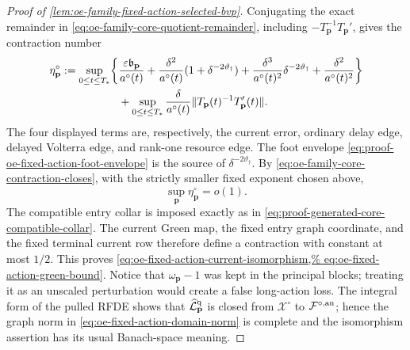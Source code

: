 \begin{proof}[Proof of
\cref{lem:oe-family-fixed-action-selected-bvp}]
Conjugating the exact remainder in
\cref{eq:oe-family-core-quotient-remainder}, including
\(-T_{\mathbf p}^{-1}T_{\mathbf p}'\), gives the contraction number
\begin{align}
 \eta_{\mathbf p}^\circ
 :=\sup_{0\le t\le T_*}\biggl\{
 &\frac{\varepsilon\mathfrak b_{\mathbf p}}{a^\circ(t)}
 +\frac{\delta^2}{a^\circ(t)}
       (1+\delta^{-2\vartheta_\dagger})
 +\frac{\delta^3}{a^\circ(t)^2}
       \delta^{-2\vartheta_\dagger}
 +\frac{\delta^2}{a^\circ(t)^2}\biggr\}\notag\\
 &+\sup_{0\le t\le T_*}
   \frac{\delta}{a^\circ(t)}
    \|T_{\mathbf p}(t)^{-1}T_{\mathbf p}'(t)\|.             \label{eq:proof-oe-fixed-action-contraction-number}
\end{align}
The four displayed terms are, respectively, the current error, ordinary
delay edge, delayed Volterra edge, and rank-one resource edge.  The foot
envelope
\cref{eq:proof-oe-fixed-action-foot-envelope} is the source of
\(\delta^{-2\vartheta_\dagger}\).  By
\cref{eq:oe-family-core-contraction-closes}, with the strictly smaller
fixed exponent chosen above,
\begin{equation}
 \sup_{\mathbf p}\eta_{\mathbf p}^\circ=o(1).   \label{eq:proof-oe-fixed-action-contraction-closes}
\end{equation}
The compatible entry collar is imposed exactly as in
\cref{eq:proof-generated-core-compatible-collar}.  The current Green
map, the fixed entry graph coordinate, and the fixed terminal current
row therefore define a contraction with constant at most \(1/2\).
This proves
\cref{eq:oe-fixed-action-current-isomorphism,%
eq:oe-fixed-action-green-bound}.  Notice that
\(\omega_{\mathbf p}-1\) was kept in the principal blocks; treating it
as an unscaled perturbation would create a false long-action loss.
The integral form of the pulled RFDE shows that
\(\widehat{\mathcal L}_{\mathbf p}^{\rm q}\) is closed from
\(\mathcal X^\circ\) to \(\mathcal F^{\circ,\rm an}\); hence the graph
norm in \cref{eq:oe-fixed-action-domain-norm} is complete and the
isomorphism assertion has its usual Banach-space meaning.


\end{proof}
